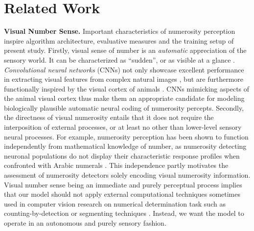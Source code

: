 \documentclass[twocolumn]{article}
\begin{document}
\hypertarget{related-work}{%
\section{Related Work}\label{related-work}}

\newcommand{\relatedss}[2]{{\bfseries #1. }{#2}}

\relatedss{Visual Number Sense}{Important characteristics of numerosity perception inspire algorithm architecture, evaluative measures and the  training setup of present study. Firstly, visual sense of number is an \emph{automatic} appreciation of the sensory world. It can be characterized as ``sudden'', or as visible at a glance \citetext{\citealp[p.~57]{dehaene2011number}; \citealp{zhang2016salient}}. \emph{Convolutional neural networks} (CNNs) not only showcase excellent performance in extracting visual features from complex natural images \citetext{\citealp{GoogleDeepMind}; \citealp{krizhevsky2012imagenet}; \citealp[for visual number sense and CNNs see][]{zhang2016salient}}, but are furthermore functionally inspired by the visual cortex of animals \citep[specifically cats, see][]{lecun1995convolutional}. CNNs mimicking aspects of the animal visual cortex thus make them an appropriate candidate for modeling biologically plausible automatic neural coding of numerosity percepts. 
Secondly, the directness of visual numerosity entails that it does not require the interposition of external processes, or at least no other than lower-level sensory neural processes. For example, numerosity perception has been shown to function independently from mathematical knowledge of number, as numerosity detecting neuronal populations do not display their characteristic response profiles when confronted with Arabic numerals \citep{harvey2013topographic, poncet2016individuation}. This independence partly motivates the assessment of numerosity detectors solely encoding visual numerosity information. Visual number sense being an immediate and purely perceptual process implies that our model should not apply external computational techniques sometimes used in computer vision research on numerical determination task such as counting-by-detection \citep[which requires both arithmetic and iterative attention to all group members, see][]{zhang2016salient, detection2016unconstrained} or segmenting techniques \citep[e.g.][]{chattopadhyay2016counting}. Instead, we want the model to operate in an autonomous and purely sensory fashion.}
\end{document}
